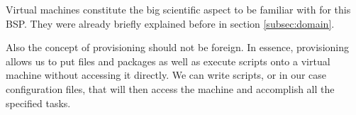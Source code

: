 Virtual machines constitute the big scientific aspect to be familiar
with for this BSP. They were already briefly explained before in
section \ref{subsec:domain}.

Also the concept of provisioning should not be foreign. In essence,
provisioning allows us to put files and packages as well as execute
scripts onto a virtual machine without accessing it directly. We can
write scripts, or in our case configuration files, that will then
access the machine and accomplish all the specified tasks.
